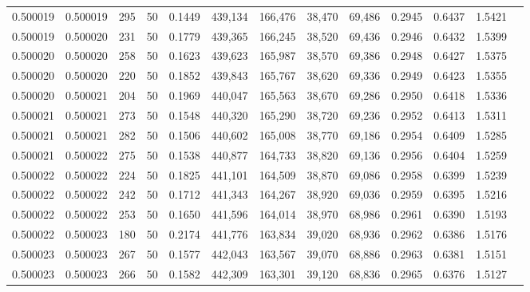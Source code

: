 \begin{tabular}{rrrrrrrrrrrrr}
0.500019 & 0.500019 &   295 &  50 &                                     0.1449 & 439,134 & 166,476 &  38,470 &  69,486 & 0.2945 & 0.6437 & 1.5421 \\
0.500019 & 0.500020 &   231 &  50 &                                     0.1779 & 439,365 & 166,245 &  38,520 &  69,436 & 0.2946 & 0.6432 & 1.5399 \\
0.500020 & 0.500020 &   258 &  50 &                                     0.1623 & 439,623 & 165,987 &  38,570 &  69,386 & 0.2948 & 0.6427 & 1.5375 \\
0.500020 & 0.500020 &   220 &  50 &                                     0.1852 & 439,843 & 165,767 &  38,620 &  69,336 & 0.2949 & 0.6423 & 1.5355 \\
0.500020 & 0.500021 &   204 &  50 &                                     0.1969 & 440,047 & 165,563 &  38,670 &  69,286 & 0.2950 & 0.6418 & 1.5336 \\
0.500021 & 0.500021 &   273 &  50 &                                     0.1548 & 440,320 & 165,290 &  38,720 &  69,236 & 0.2952 & 0.6413 & 1.5311 \\
0.500021 & 0.500021 &   282 &  50 &                                     0.1506 & 440,602 & 165,008 &  38,770 &  69,186 & 0.2954 & 0.6409 & 1.5285 \\
0.500021 & 0.500022 &   275 &  50 &                                     0.1538 & 440,877 & 164,733 &  38,820 &  69,136 & 0.2956 & 0.6404 & 1.5259 \\
0.500022 & 0.500022 &   224 &  50 &                                     0.1825 & 441,101 & 164,509 &  38,870 &  69,086 & 0.2958 & 0.6399 & 1.5239 \\
0.500022 & 0.500022 &   242 &  50 &                                     0.1712 & 441,343 & 164,267 &  38,920 &  69,036 & 0.2959 & 0.6395 & 1.5216 \\
0.500022 & 0.500022 &   253 &  50 &                                     0.1650 & 441,596 & 164,014 &  38,970 &  68,986 & 0.2961 & 0.6390 & 1.5193 \\
0.500022 & 0.500023 &   180 &  50 &                                     0.2174 & 441,776 & 163,834 &  39,020 &  68,936 & 0.2962 & 0.6386 & 1.5176 \\
0.500023 & 0.500023 &   267 &  50 &                                     0.1577 & 442,043 & 163,567 &  39,070 &  68,886 & 0.2963 & 0.6381 & 1.5151 \\
0.500023 & 0.500023 &   266 &  50 &                                     0.1582 & 442,309 & 163,301 &  39,120 &  68,836 & 0.2965 & 0.6376 & 1.5127 \\

\end{tabular}
